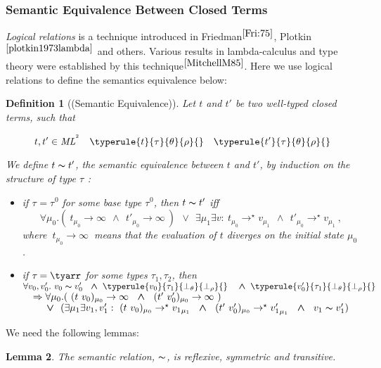 \documentclass[a4paper,11pt,oneside]{article}
\theoremstyle{plain}
\newtheorem{definition}{Definition}[subsection]
\newtheorem{lemma}[definition]{Lemma}
\newcommand{\tmapp}[2]{(#1 ~ #2)}
\newcommand{\ty}[1][]{\tau_{#1}}
\newcommand{\bwedge}{\boldsymbol{~\wedge~}}
\newcommand{\bvee}{\boldsymbol{~\vee~}}
\newcommand{\bth}{\bot_\theta}
\newcommand{\brh}{\bot_\rho}
\newcommand{\evalstar}[4]{~#1_{\mu_#2} \rightarrow^{\star} #3_{\mu_#4} ~}
\newcommand{\evalinfty}[2]{~#1_{#2} \rightarrow \infty ~}
\newcommand{\eqv}[1]{#1 \thicksim #1'}
\newcommand{\inlsrc}{\textit{ML}^{^2}}
\begin{document}
\subsubsection*{Semantic Equivalence Between Closed Terms}

\textit{Logical relations} is a technique introduced in Friedman$^{\cite{Fri:75}}$, Plotkin$^{\cite{plotkin1973lambda}}$ and others.
	Various results in lambda-calculus and type theory were established by this technique$^{\cite{MitchellM85}}$.
	Here we use logical relations to define the semantics equivalence below: 

\label{semantic equivalence}
\begin{definition}[(Semantic Equivalence)]
	Let $t$ and $t'$ be two well-typed closed terms,	such that 
	
	$$ t,t' \in \inlsrc  \quad 
		\typerule{t}{\tau}{\theta}{\rho}{} \quad \typerule{t'}{\tau}{\theta}{\rho}{} 
	$$

	We define $\eqv{t}$, the \textit{semantic equivalence} between $t$ and $t'$, 
	by induction on the structure of type $\ty$ :
	
	\begin{itemize}
		\item[$(\alpha)$]

			if $\ty{} = \ty{}^0$ for some base type $\ty{}^0$, then $\eqv{t}$ iff
			$$	\forall \mu_0.(\evalinfty{t}{\mu_0} \bwedge \evalinfty{t'}{\mu_0})~
					\bvee ~ \exists \mu_1 \exists v: 
					\evalstar{t}{0}{v}{1} \bwedge \evalstar{t'}{0}{v}{1}, $$
			where $\evalinfty{t}{\mu_0}$ means that the evaluation of $t$ diverges on the initial state $\mu_0$.
		\item[$(\beta)$]
			if $\ty = \tyarr$ for some types $\ty[1], \ty[2]$,
			then\\[0.2cm]
			$\hspace*{0em}\forall v_0, v'_0. ~ \eqv{v_0} ~ 
			\bwedge \typerule{v_0}{\ty[1]}{\bth}{\brh}{} ~~
			\bwedge \typerule{v'_0}{\ty[1]}{\bth}{\brh}{} $ \\[0.2cm]
			$\hspace*{1em}
			\Rightarrow \forall\mu_0.(\evalinfty{\tmapp{t}{v_0}}{\mu_0}
			\bwedge\evalinfty{\tmapp{t'}{v'_0}}{\mu_0})$\\[0.2cm]
			$\hspace*{2em}\bvee~(\exists \mu_1 \exists v_1, v'_1 : 
			 	\evalstar{\tmapp{t}{v_0}}{0}{{v_1}}{1} 
				\bwedge \evalstar{\tmapp{t'}{v'_0}}{0}{{v'_1}}{1}
				\bwedge~\eqv{v_1})$				
	\end{itemize}
	\end{definition}
\vspace*{0.5cm}
We need the following lemmas:
	\begin{lemma} 
		The semantic relation, $\thicksim$, is reflexive, 	
		symmetric and transitive.
	\end{lemma}
	
\end{document}

